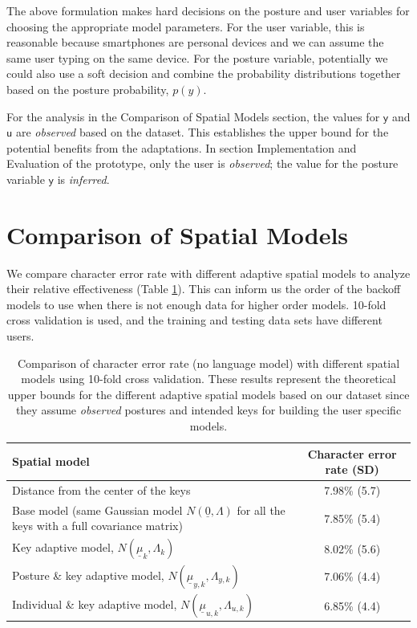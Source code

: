 \documentclass{sigchi}
\newcommand\tabhead[1]{\small\textbf{#1}}
\begin{document}
The above formulation makes hard decisions on the 
posture and user variables for choosing the appropriate model parameters. For the user variable, 
this is reasonable because smartphones are personal devices and we can assume the 
same user typing on the same device. For the posture variable, potentially we could also 
use a soft decision and combine the probability distributions together based on the posture probability, $p(y)$. 

For the analysis in the Comparison of Spatial Models section, the values for $\textsf{y}$ and $\textsf{u}$ are 
\textit{observed} based on the dataset. This establishes the upper bound for the potential benefits from the adaptations. In section Implementation and Evaluation of the prototype, only the user is \textit{observed}; the value for the posture variable $\textsf{y}$ is \textit{inferred}.

\section{Comparison of Spatial Models}
We compare character error rate with different adaptive spatial models to analyze their
relative effectiveness (Table \ref{tab:comparison}). This can inform us the order of the
backoff models to use when there is not enough data for higher order models.
10-fold cross validation is used, and the training and testing data sets have different users.

\begin{table} [tb]
  \centering
  \begin{tabular}{|l|c|}
    \hline
    \tabhead{Spatial model} &
    \multicolumn{1}{|p{0.2\columnwidth}|}{\centering\tabhead{Character
    error rate (SD)}} \\
    \hline
    Distance from the center of the keys & 7.98\% (5.7) \\
    \hline
    \multicolumn{1}{|p{0.7\columnwidth}|}{Base model (same Gaussian model $N(\underline 0, \Lambda)$ for
    all the keys with a full covariance matrix)} & 7.85\% (5.4) \\
    \hline
    \multicolumn{1}{|p{0.7\columnwidth}|}{Key adaptive model, $N(\underline
    \mu_k, \Lambda_k)$} & 8.02\% (5.6) \\
    \hline
    \multicolumn{1}{|p{0.7\columnwidth}|}{Posture \& key adaptive model,
    $N(\underline \mu_{y,k}, \Lambda_{y,k})$} & 7.06\% (4.4) \\
    \hline
     \multicolumn{1}{|p{0.7\columnwidth}|}{Individual \& key adaptive model,
     $N(\underline \mu_{u,k}, \Lambda_{u,k})$} & 6.85\% (4.4) \\
    \hline
  \end{tabular}
  \caption{Comparison of character error rate (no language model) with
  different spatial models using 10-fold cross validation. These results represent the theoretical upper bounds for the different adaptive spatial models based on our dataset since they assume \textit{observed} postures and intended keys for building the user specific models.}
  \label{tab:comparison}
\end{table}
\end{document}
